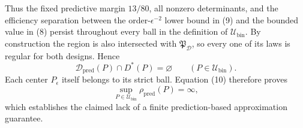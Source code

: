 Thus the fixed predictive margin \(13/80\), all nonzero determinants, and the efficiency separation between the order-\(\epsilon^{-2}\) lower bound in (9) and the bounded value in (8) persist throughout every ball in the definition of \(\mathcal U_{\mathrm{bin}}\).  By construction the region is also intersected with \(\mathfrak P_{\mathcal D}\), so every one of its laws is regular for both designs.  Hence
\[
 \mathcal D_{\mathrm{pred}}(P)\cap D^*(P)=\varnothing
 \qquad(P\in\mathcal U_{\mathrm{bin}}).
\]
Each center \(P_{\epsilon}\) itself belongs to its strict ball.  Equation (10) therefore proves
\[
 \sup_{P\in\mathcal U_{\mathrm{bin}}}\rho_{\mathrm{pred}}(P)=\infty,
\]
which establishes the claimed lack of a finite prediction-based approximation guarantee.